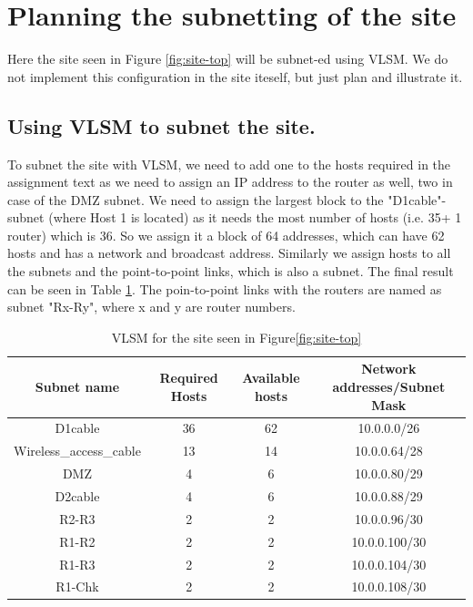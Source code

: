 \documentclass{article}
\begin{document}
\section{Planning the subnetting of the site}

Here the site seen in Figure \ref{fig:site-top} will be subnet-ed using VLSM. We do not implement this configuration in the site iteself, but just plan and illustrate it.


\subsection{Using VLSM to subnet the site.} 

To subnet the site with VLSM, we need to add one to the hosts required in the assignment text as we need to assign an IP address to the router as well, two in case of the DMZ subnet. We need to assign the largest block to the "D1cable"-subnet (where Host 1 is located) as it needs the most number of hosts (i.e. 35+ 1 router) which is 36. So we assign it a block of 64 addresses, which can have 62 hosts and has a network and broadcast address. Similarly we assign hosts to all the subnets and the point-to-point links, which is also a subnet. The final result can be seen in Table \ref{tab:vlsm-site}. The poin-to-point links with the routers are named as subnet "Rx-Ry", where x and y are router numbers.

\begin{table}[!h]
    \centering
    \begin{tabular}{|c|c|c|c|}
    \hline
         Subnet name & Required Hosts & Available hosts & Network addresses/Subnet Mask    \\
         \hline
         D1cable & 36 & 62 & 10.0.0.0/26 \\
         Wireless\_access\_cable & 13 & 14 & 10.0.0.64/28 \\
         DMZ & 4 & 6 & 10.0.0.80/29 \\ 
         D2cable & 4 & 6 & 10.0.0.88/29\\
         R2-R3 & 2 & 2 & 10.0.0.96/30 \\
         R1-R2 & 2 & 2 & 10.0.0.100/30 \\
         R1-R3 & 2 & 2 & 10.0.0.104/30 \\
         R1-Chk & 2 & 2 & 10.0.0.108/30\\
         \hline
    \end{tabular}
    \caption{VLSM for the site seen in Figure\ref{fig:site-top}}
    \label{tab:vlsm-site}
\end{table}
\end{document}
